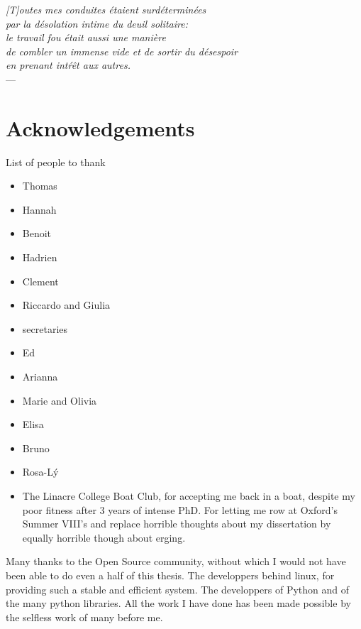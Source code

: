 

\begin{flushright}{\slshape    
    [T]outes mes conduites \'etaient surd\'etermin\'ees\\
    par la d\'esolation intime du deuil solitaire:\\
    le travail fou \'etait aussi une mani\`ere \\
    de combler un immense vide et de sortir du d\'esespoir\\
    en prenant int\'r\^et aux autres.} \\ \medskip
    ---  \citep{Bourdieu:2001}
\end{flushright}

\begingroup

\let\clearpage\relax
\let\cleardoublepage\relax
\let\cleardoublepage\relax

\chapter*{Acknowledgements} %

List of people to thank

\begin{itemize}
	\item Thomas
	\item Hannah
	\item Benoit
        \item Hadrien
        \item Clement
	\item Riccardo and Giulia
	\item secretaries
	\item Ed
	\item Arianna
	\item Marie and Olivia
	\item Elisa
	\item Bruno
	\item Rosa-L\'y
        \item The Linacre College Boat Club, for accepting me back in a boat,
            despite my poor fitness after $3$ years of intense PhD. For letting
            me row at Oxford's Summer VIII's and replace horrible thoughts about
            my dissertation by equally horrible though about erging.
\end{itemize}

\noindent Many thanks to the Open Source community, without which I would not
have been able to do even a half of this thesis. The developpers behind linux,
for providing such a stable and efficient system. The developpers of Python and
of the many python libraries. All the work I have done has been made possible by
the selfless work of many before me.


\endgroup
